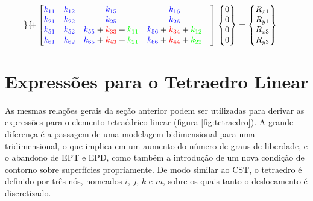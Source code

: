 \begin{landscape}
\begin{align*}
\begin{Bmatrix}
        \end{Bmatrix} + 
        \begin{bmatrix}
            \textcolor{blue}{k_{11}} &  \textcolor{blue}{k_{12}} &  \textcolor{blue}{k_{15}} &  \textcolor{blue}{k_{16}} & \\ 
            \textcolor{blue}{k_{21}} &  \textcolor{blue}{k_{22}} &  \textcolor{blue}{k_{25}} &  \textcolor{blue}{k_{26}} & \\ 
            \textcolor{blue}{k_{51}} &  \textcolor{blue}{k_{52}} &  \textcolor{blue}{k_{55}} + \textcolor{red}{k_{33}} + \textcolor{green}{k_{11}} &  \textcolor{blue}{k_{56}} + \textcolor{red}{k_{34}} + \textcolor{green}{k_{12}} & \\ 
            \textcolor{blue}{k_{61}} &  \textcolor{blue}{k_{62}} &  \textcolor{blue}{k_{65}} + \textcolor{red}{k_{43}} + \textcolor{green}{k_{21}} &  \textcolor{blue}{k_{66}} + \textcolor{red}{k_{44}} + \textcolor{green}{k_{22}} & \\ 
        \end{bmatrix}
        \begin{Bmatrix}
            0 \\ 0 \\ 0 \\ 0
        \end{Bmatrix}  &=
        \begin{Bmatrix}
            R_{x1} \\ R_{y1} \\ R_{x3} \\ R_{y3}
        \end{Bmatrix}
    \end{align*}
\end{landscape}

\section{Expressões para o Tetraedro Linear}

As mesmas relações gerais da seção anterior podem ser utilizadas para derivar as expressões para o elemento tetraédrico linear (figura \ref{fig:tetraedro}). A grande diferença é a passagem de uma modelagem bidimensional para uma tridimensional, o que implica em um aumento do número de graus de liberdade, e o abandono de EPT e EPD, como também a introdução de um nova condição de contorno sobre superfícies propriamente. De modo similar ao CST, o tetraedro é definido por três nós, nomeados $i$, $j$, $k$ e $m$, sobre os quais tanto o deslocamento é discretizado.

